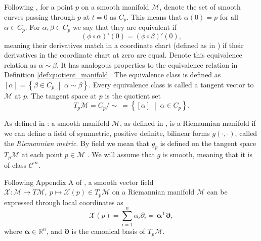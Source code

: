 \begin{definition}\label{def:tangent_space}
    Following \cite[Def.~8.33]{Boumal2023}, for a point $p$ on a smooth manifold $\mathcal{M}$, denote the set of smooth curves \cite[Def.~8.5]{Boumal2023} passing through $p$ at $t=0$ as $C_{p}$. This means that $\alpha(0)=p$ for all $\alpha\in C_{p}$. For $\alpha, \beta\in C_{p}$ we say that they are equivalent if 
    \begin{equation*}
        (\phi\circ \alpha)'(0)=(\phi\circ \beta)'(0),
    \end{equation*}
    meaning their derivatives match in a \textup{coordinate chart} (defined as in \cite[p.~4]{Lee2012:1}) if their derivatives in the coordinate chart at zero are equal. Denote this equivalence relation as $\alpha\sim \beta$. It has analogous properties to the equivalence relation in Definition \ref{def:quotient_manifold}. The equivalence class is defined as $[\alpha]=\left\{\beta\in C_{p} \;\middle|\; \alpha\sim \beta\right\}$. Every equivalence class is called a \textup{tangent vector} to $\mathcal{M}$ at $p$. The \textup{tangent space} at $p$ is the quotient set
    \begin{equation*}
        T_{p}\mathcal{M}=C_{p}/\sim~=\left\{[\alpha] \;\middle|\; \alpha\in C_{p}\right\}.
    \end{equation*}  
\end{definition}

\begin{definition}\label{def:riemannian_manifold}
    As defined in \cite[def~2.6,~p.~179]{Boothby1975}: a \textup{smooth manifold} $\mathcal{M}$, as defined in \cite[p.~13]{Lee2012:1},  is a \textup{Riemannian manifold} if we can define a field of symmetric, positive definite, bilinear forms $g(\cdot,\cdot)$, called the \textit{Riemannian metric}. By field we mean that $g_p$ is defined on the tangent space $T_p\mathcal{M}$ at each point $p\in \mathcal{M}$ \cite[def~2.1,~p.~178]{Boothby1975}. We will assume that $g$ is smooth, meaning that it is of class $\mathcal{C}^\infty$.
\end{definition}


\begin{definition}\label{def:vector_field_on_manifold}
    Following Appendix A of \cite{JensenZimmermann2024}, a smooth vector field $\mathcal{X}\colon \mathcal{M}\xrightarrow{}T \mathcal{M},~p\mapsto \mathcal{X}(p)\in T_{p}\mathcal{M}$ on a Riemannian manifold $\mathcal{M}$ can be expressed through local coordinates as 
    \begin{equation*}
        \mathcal{X}(p)=\sum\limits_{i=1}^{n}\alpha_{i}\partial_{i}\eqqcolon \boldsymbol{\alpha}^{\mathrm{T}}\boldsymbol{\partial},
    \end{equation*}
    where $\boldsymbol{\alpha}\in \mathbb{R}^{n}$, and $\boldsymbol{\partial}$ is the canonical basis of $T_{p}\mathcal{M}$.
    
\end{definition}


